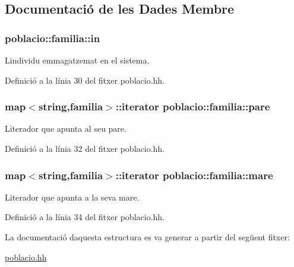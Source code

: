 \subsection{Documentació de les Dades Membre}
\subsubsection[{\texorpdfstring{in}{in}}]{ poblacio\+::familia\+::in}\hypertarget{structpoblacio_1_1familia_a184e9fe52d7cf62ca133ac1d900f87ea}{}\label{structpoblacio_1_1familia_a184e9fe52d7cf62ca133ac1d900f87ea}


L\textquotesingle{}individu emmagatzemat en el sistema. 



Definició a la línia 30 del fitxer poblacio.\+hh.

\subsubsection[{\texorpdfstring{pare}{pare}}]{\setlength{\rightskip}{0pt plus 5cm}map$<$string,{\bf familia}$>$\+::iterator poblacio\+::familia\+::pare}\hypertarget{structpoblacio_1_1familia_af87f56b016ade8b4bb02a49036de5f74}{}\label{structpoblacio_1_1familia_af87f56b016ade8b4bb02a49036de5f74}


L\textquotesingle{}iterador que apunta al seu pare. 



Definició a la línia 32 del fitxer poblacio.\+hh.

\subsubsection[{\texorpdfstring{mare}{mare}}]{\setlength{\rightskip}{0pt plus 5cm}map$<$string,{\bf familia}$>$\+::iterator poblacio\+::familia\+::mare}\hypertarget{structpoblacio_1_1familia_a9d44bf543d7f856a93feac40de233c42}{}\label{structpoblacio_1_1familia_a9d44bf543d7f856a93feac40de233c42}


L\textquotesingle{}iterador que apunta a la seva mare. 



Definició a la línia 34 del fitxer poblacio.\+hh.



La documentació d\textquotesingle{}aquesta estructura es va generar a partir del següent fitxer\+:\begin{DoxyCompactItemize}
\item 
\hyperlink{poblacio_8hh}{poblacio.\+hh}\end{DoxyCompactItemize}
